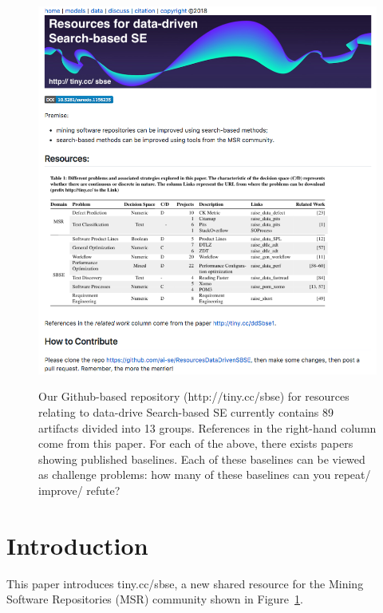 \documentclass[table, xcdraw, sigconf,review, anonymous]{acmart}
\begin{document}


\keywords{}


\maketitle
\pagestyle{plain}
% 



\begin{figure}[!t]
{\center
\includegraphics[width=5.5in]{img/page1.png}}
\caption{Our Github-based repository (http://tiny.cc/sbse) for resources relating to data-drive Search-based SE 
currently contains 89 artifacts divided into 13 groups. References in the right-hand column come from this paper.
For each of the above, there exists papers showing published baselines. Each of these baselines can be viewed as challenge problems:
how many of these baselines can you repeat/ improve/ refute?  }\label{fig:one}
\end{figure}

\section{Introduction}
This paper introduces tiny.cc/sbse, a  new shared resource for the Mining Software
Repositories (MSR) community shown in Figure~\ref{fig:one}.
\end{document}
